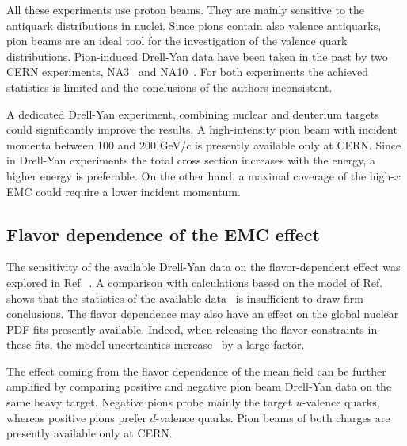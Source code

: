All these experiments use proton beams. They are mainly sensitive to the antiquark 
distributions in nuclei.  Since pions contain also valence antiquarks, pion beams are  
an ideal tool for the investigation of the valence quark distributions. Pion-induced Drell-Yan data have 
been taken in the past by two CERN experiments, NA3~\cite{Badier:1981ci} 
and NA10~\cite{Bordalo:1987cs}.  For both experiments the achieved statistics is limited
and the conclusions of the authors inconsistent.  

A dedicated Drell-Yan experiment, 
combining nuclear and deuterium targets could significantly improve the results. 
A high-intensity pion beam with incident momenta between 100 and 200 GeV/$c$ is presently available 
only at CERN. Since in Drell-Yan experiments the total cross section increases with the energy, a higher 
energy is preferable. On the other hand, a maximal coverage of the high-$x$ EMC could require a 
lower incident momentum.  

\subsection{Flavor dependence of the EMC effect} 

The sensitivity of the available Drell-Yan data on the flavor-dependent effect was explored in 
Ref.~\cite{Dutta:2010pg}. A comparison with calculations based on the model of Ref.~\cite{Cloet:2009qs} 
shows that the  statistics of the available data~\cite{Badier:1981ci,Bordalo:1987cs} is insufficient to draw firm conclusions. 
The flavor dependence may also have an effect 
on the global nuclear PDF fits presently available. Indeed, when releasing the flavor constraints in these fits, 
the model uncertainties increase~\cite{Paakkinen:2016wxk} by a large factor. 

The effect coming from the flavor dependence of the mean field can be further amplified by 
comparing positive and negative pion beam Drell-Yan data on the same heavy target. Negative pions probe mainly the 
target $u$-valence quarks, whereas positive pions prefer $d$-valence quarks. Pion beams of both charges
are presently available only at CERN. 

